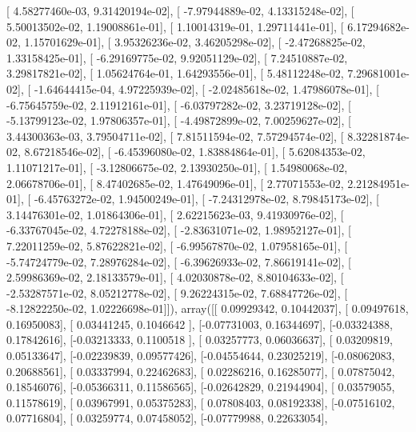 \documentclass{article}
\begin{document}
       [  4.58277460e-03,   9.31420194e-02],
       [ -7.97944889e-02,   4.13315248e-02],
       [  5.50013502e-02,   1.19008861e-01],
       [  1.10014319e-01,   1.29711441e-01],
       [  6.17294682e-02,   1.15701629e-01],
       [  3.95326236e-02,   3.46205298e-02],
       [ -2.47268825e-02,   1.33158425e-01],
       [ -6.29169775e-02,   9.92051129e-02],
       [  7.24510887e-02,   3.29817821e-02],
       [  1.05624764e-01,   1.64293556e-01],
       [  5.48112248e-02,   7.29681001e-02],
       [ -1.64644415e-04,   4.97225939e-02],
       [ -2.02485618e-02,   1.47986078e-01],
       [ -6.75645759e-02,   2.11912161e-01],
       [ -6.03797282e-02,   3.23719128e-02],
       [ -5.13799123e-02,   1.97806357e-01],
       [ -4.49872899e-02,   7.00259627e-02],
       [  3.44300363e-03,   3.79504711e-02],
       [  7.81511594e-02,   7.57294574e-02],
       [  8.32281874e-02,   8.67218546e-02],
       [ -6.45396080e-02,   1.83884864e-01],
       [  5.62084353e-02,   1.11071217e-01],
       [ -3.12806675e-02,   2.13930250e-01],
       [  1.54980068e-02,   2.06678706e-01],
       [  8.47402685e-02,   1.47649096e-01],
       [  2.77071553e-02,   2.21284951e-01],
       [ -6.45763272e-02,   1.94500249e-01],
       [ -7.24312978e-02,   8.79845173e-02],
       [  3.14476301e-02,   1.01864306e-01],
       [  2.62215623e-03,   9.41930976e-02],
       [ -6.33767045e-02,   4.72278188e-02],
       [ -2.83631071e-02,   1.98952127e-01],
       [  7.22011259e-02,   5.87622821e-02],
       [ -6.99567870e-02,   1.07958165e-01],
       [ -5.74724779e-02,   7.28976284e-02],
       [ -6.39626933e-02,   7.86619141e-02],
       [  2.59986369e-02,   2.18133579e-01],
       [  4.02030878e-02,   8.80104633e-02],
       [ -2.53287571e-02,   8.05212778e-02],
       [  9.26224315e-02,   7.68847726e-02],
       [ -8.12822250e-02,   1.02226698e-01]]), array([[ 0.09929342,  0.10442037],
       [ 0.09497618,  0.16950083],
       [ 0.03441245,  0.1046642 ],
       [-0.07731003,  0.16344697],
       [-0.03324388,  0.17842616],
       [-0.03213333,  0.1100518 ],
       [ 0.03257773,  0.06036637],
       [ 0.03209819,  0.05133647],
       [-0.02239839,  0.09577426],
       [-0.04554644,  0.23025219],
       [-0.08062083,  0.20688561],
       [ 0.03337994,  0.22462683],
       [ 0.02286216,  0.16285077],
       [ 0.07875042,  0.18546076],
       [-0.05366311,  0.11586565],
       [-0.02642829,  0.21944904],
       [ 0.03579055,  0.11578619],
       [ 0.03967991,  0.05375283],
       [ 0.07808403,  0.08192338],
       [-0.07516102,  0.07716804],
       [ 0.03259774,  0.07458052],
       [-0.07779988,  0.22633054],
\end{document}
